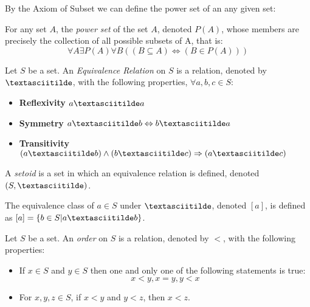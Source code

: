 \documentclass{report}
\begin{document}
			By the Axiom of Subset we can define the power set of an any given set:
			
			\begin{defn} \label{def_powerset}
				For any set $A$, the \emph{power set} of the set $A$, denoted $P(A)$, whose members are precisely the collection of all possible subsets of A, that is:
				\begin{displaymath}
					\forall A \exists P(A) \forall B((B \subseteq A) \Leftrightarrow (B \in P(A)))
				\end{displaymath}
			\end{defn}
		
			\begin{defn} \label{def_equiv_rel}
				Let $S$ be a set. An \emph{Equivalence Relation} on $S$ is a relation, denoted by $\textasciitilde$, with the following properties, $\forall a,b,c \in S$:
				\begin{itemize}
					\item \textbf{Reflexivity} $a\textasciitilde a$
					\item \textbf{Symmetry} $a\textasciitilde b \Leftrightarrow b\textasciitilde a$
					\item \textbf{Transitivity} $(a\textasciitilde b) \wedge (b\textasciitilde c) \Rightarrow (a\textasciitilde c)$
				\end{itemize}
			\end{defn}
		
			\begin{defn}[Setoid] \label{def_setoid}
				A \emph{setoid} is a set in which an equivalence relation is defined, denoted $(S,\textasciitilde )$.
			\end{defn}
	
			\begin{defn} \label{def_equivalence_class}
				The equivalence class of $a\in S$ under $\textasciitilde $, denoted $[a]$, is defined as $[a]=\{b \in S|a \textasciitilde b\}$.
			\end{defn}

			\begin{defn}[Order] \label{def_order}
				Let $S$ be a set. An \emph{order} on $S$ is a relation, denoted by $<$, with the following properties:
				\begin{itemize}
					\item If $x \in S$ and $y \in S$ then one and only one of the following statements is true:
					\begin{displaymath}
						x<y, x=y, y<x
					\end{displaymath}
					\item For $x,y,z \in S$, if $x<y$ and $y<z$, then $x<z$.
				\end{itemize}
			\end{defn}
\end{document}
